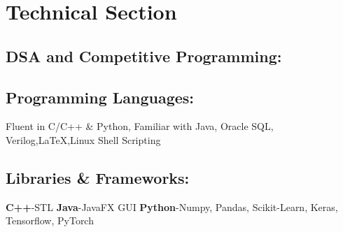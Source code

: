 \documentclass{article}
\begin{document}





\section*{Technical Section}

\subsection*{DSA and Competitive Programming:}

\subsection*{Programming Languages:}
Fluent in C/C++ \& Python, Familiar with Java, Oracle SQL, Verilog,{\LaTeX},Linux Shell Scripting

\subsection*{Libraries \& Frameworks:}
\textbf{C++}-STL
\textbf{Java}-JavaFX GUI
\textbf{Python}-Numpy, Pandas, Scikit-Learn, Keras, Tensorflow, PyTorch
\end{document}
